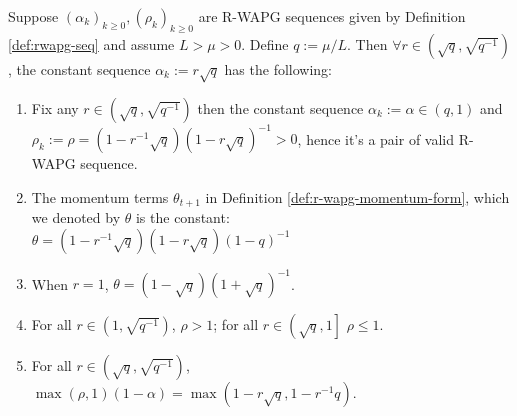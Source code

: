 \documentclass[12pt]{article}
\begin{document}
    \begin{lemma}\label{lemma:constant-rwapg-seq}
        Suppose $(\alpha_k)_{k \ge 0}, (\rho_k)_{k \ge 0}$ are R-WAPG sequences given by Definition \ref{def:rwapg-seq} and assume $L > \mu > 0$.
        Define $q := \mu/L$. 
        Then $\forall r \in \left(\sqrt{q},\sqrt{q^{-1}}\right)$, the constant sequence $\alpha_k := r \sqrt{q}$ has the following: 
        \begin{enumerate}
            \item Fix any $r \in \left(\sqrt{q}, \sqrt{q^{-1}}\right)$ then the constant sequence $\alpha_k := \alpha \in (q, 1)$ and\\
            $\rho_k := \rho=\left(1-r^{-1}\sqrt{q}\right)\left(1 - r \sqrt{q}\right)^{-1} > 0$, hence it's a pair of valid R-WAPG sequence. 
            \item The momentum terms $\theta_{t + 1}$ in Definition \ref{def:r-wapg-momentum-form}, which we denoted by $\theta$ is the constant:\\ $\theta = (1 - r^{-1}\sqrt{q})(1 - r\sqrt{q})(1- q)^{-1}$
            \item When $r = 1$, $\theta = (1- \sqrt{q})(1 + \sqrt{q})^{-1}$. 
            \item For all $r \in \left(1, \sqrt{q^{-1}}\right)$, $\rho > 1$; for all $r \in \left(\sqrt{q}, 1\right]$ $\rho \le 1$. 
            \item For all $r \in \left(\sqrt{q}, \sqrt{q^{-1}}\right)$, $\max(\rho, 1)(1 - \alpha) = \max\left(1 - r\sqrt{q}, 1 - r^{-1}q\right)$. 
        \end{enumerate}
    \end{lemma}
\end{document}

